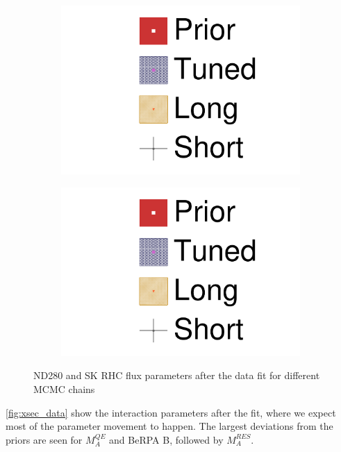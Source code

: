 \begin{figure}[h]
\begin{subfigure}[t]{0.24\textwidth}
		\includegraphics[width=\textwidth, trim={0mm 0mm 0mm 0mm}, clip,page=16]{figures/mach3/data/2017b_NewData_NewDet_UpdXsecStep_2Xsec_4Det_5Flux_0_2017b_June_NewDet_merge_2017b_NewDet_June_Long_0}
	\end{subfigure}
	\begin{subfigure}[t]{0.24\textwidth}
		\includegraphics[width=\textwidth, trim={0mm 0mm 0mm 0mm}, clip,page=17]{figures/mach3/data/2017b_NewData_NewDet_UpdXsecStep_2Xsec_4Det_5Flux_0_2017b_June_NewDet_merge_2017b_NewDet_June_Long_0}
	\end{subfigure}
	\caption{ND280 and SK RHC flux parameters after the data fit for different MCMC chains}
	\label{fig:flux_data_rhc}
\end{figure}

\autoref{fig:xsec_data} show the interaction parameters after the fit, where we expect most of the parameter movement to happen. The largest deviations from the priors are seen for $M_A^{QE}$ and BeRPA B, followed by $M_A^{RES}$. 

